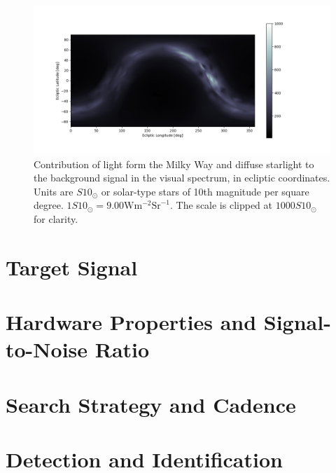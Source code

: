 \begin{figure}[htbp]
 \centering
 \includegraphics[width=1.0\textwidth]{img/background_vis_stars.png}
 \caption{Contribution of light form the Milky Way and diffuse starlight to the background signal in the visual spectrum, in ecliptic coordinates. Units are $S10_\odot$ or solar-type stars of 10th magnitude per square degree. $1S10_\odot = 9.00\mathrm{W}\mathrm{m}^{-2}\mathrm{Sr}^{-1}$. The scale is clipped at $1000 S10_\odot$ for clarity.}
 \label{fig:starsvisbackground}
\end{figure}


\section{Target Signal}
\label{sec:modelling_target}

\section{Hardware Properties and Signal-to-Noise Ratio}
\label{sec:modelling_hardware_SNR}

\section{Search Strategy and Cadence}
\label{sec:modelling_cadence}

\section{Detection and Identification}
\label{sec:modelling_identification}
